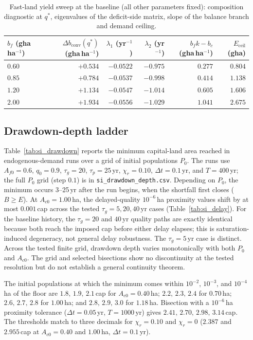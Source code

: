 \documentclass[11pt,a4paper]{article}
\newcommand{\dconv}{\Delta b_{\mathrm{conv}}}
\newcommand{\Eceil}{E_{\mathrm{ceil}}}
\begin{document}
\begin{table}[htbp]
\centering\small
\caption{Fast-land yield sweep at the baseline (all other parameters fixed): composition diagnostic at $q^*$, eigenvalues of the deficit-side matrix, slope of the balance branch and demand ceiling.}
\label{tab:si_sweep}
\begin{tabular}{l r r r r r}
\toprule
$b_f$ (gha\,ha$^{-1}$) & $\dconv(q^*)$ (gha\,ha$^{-1}$) & $\lambda_1$ (yr$^{-1}$) & $\lambda_2$ (yr$^{-1}$) & $b_fk-b_c$ (gha\,ha$^{-1}$) & $\Eceil$ (gha) \\
\midrule
$0.60$ & $+0.534$ & $-0.0522$ & $-0.975$ & $0.277$ & $0.804$ \\
$0.85$ & $+0.784$ & $-0.0537$ & $-0.998$ & $0.414$ & $1.138$ \\
$1.20$ & $+1.134$ & $-0.0547$ & $-1.014$ & $0.605$ & $1.606$ \\
$2.00$ & $+1.934$ & $-0.0556$ & $-1.029$ & $1.041$ & $2.675$ \\
\bottomrule
\end{tabular}
\end{table}

\subsection{Drawdown-depth ladder}\label{si:ladder}

Table~\ref{tab:si_drawdown} reports the minimum capital-land area reached in endogenous-demand runs over a grid of initial populations $P_0$. The runs use $A_{f0}=0.6$, $q_0=0.9$, $\tau_g=20$, $\tau_p=25$\,yr, $\chi_r=0.10$, $\Delta t=0.1$\,yr, and $T=400$\,yr; the full $P_0$ grid (step $0.1$) is in \texttt{si\_drawdown\_depth.csv}. Depending on $P_0$, the minimum occurs 3--25\,yr after the run begins, when the shortfall first closes ($B\ge E$). At $A_{c0}=1.00$\,ha, the delayed-quality $10^{-6}$\,ha proximity values shift by at most $0.001$\,cap across the tested $\tau_g=5,20,40$\,yr cases (Table~\ref{tab:si_delay}). For the baseline history, the $\tau_g=20$ and $40$\,yr quality paths are exactly identical because both reach the imposed cap before either delay elapses; this is saturation-induced degeneracy, not general delay robustness. The $\tau_g=5$\,yr case is distinct. Across the tested finite grid, drawdown depth varies monotonically with both $P_0$ and $A_{c0}$. The grid and selected bisections show no discontinuity at the tested resolution but do not establish a general continuity theorem.

The initial populations at which the minimum comes within $10^{-2}$, $10^{-3}$, and $10^{-4}$\,ha of the floor are $1.8,\,1.9,\,2.1$\,cap for $A_{c0}=0.40$\,ha; $2.2,\,2.3,\,2.4$ for $0.70$\,ha; $2.6,\,2.7,\,2.8$ for $1.00$\,ha; and $2.8,\,2.9,\,3.0$ for $1.18$\,ha. Bisection with a $10^{-6}$\,ha proximity tolerance ($\Delta t=0.05$\,yr, $T=1000$\,yr) gives $2.41,\,2.70,\,2.98,\,3.14$\,cap. The thresholds match to three decimals for $\chi_r=0.10$ and $\chi_r=0$ ($2.387$ and $2.955$\,cap at $A_{c0}=0.40$ and $1.00$\,ha, $\Delta t=0.1$\,yr). \par\pagebreak
\end{document}
